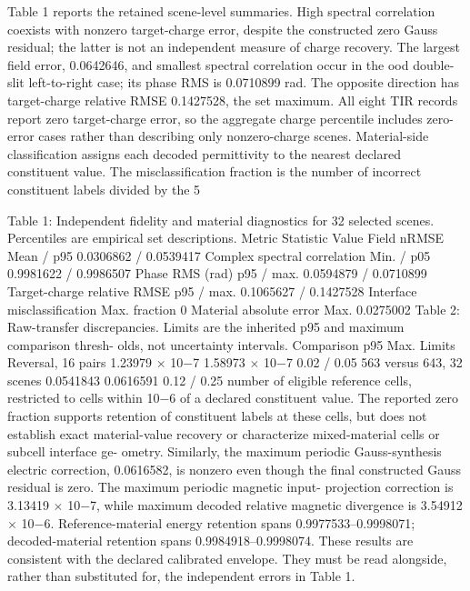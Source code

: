 \documentclass[11pt]{article}
\begin{document}
Table 1 reports the retained scene-level summaries. High spectral correlation coexists with nonzero
target-charge error, despite the constructed zero Gauss residual; the latter is not an independent
measure of charge recovery. The largest field error, 0.0642646, and smallest spectral correlation
occur in the ood double-slit left-to-right case; its phase RMS is 0.0710899 rad. The opposite
direction has target-charge relative RMSE 0.1427528, the set maximum. All eight TIR records
report zero target-charge error, so the aggregate charge percentile includes zero-error cases rather
than describing only nonzero-charge scenes.
Material-side classification assigns each decoded permittivity to the nearest declared constituent
value. The misclassification fraction is the number of incorrect constituent labels divided by the
5

Table 1: Independent fidelity and material diagnostics for 32 selected scenes. Percentiles are
empirical set descriptions.
Metric Statistic Value
Field nRMSE Mean / p95 0.0306862 / 0.0539417
Complex spectral correlation Min. / p05 0.9981622 / 0.9986507
Phase RMS (rad) p95 / max. 0.0594879 / 0.0710899
Target-charge relative RMSE p95 / max. 0.1065627 / 0.1427528
Interface misclassification Max. fraction 0
Material absolute error Max. 0.0275002
Table 2: Raw-transfer discrepancies. Limits are the inherited p95 and maximum comparison thresh-
olds, not uncertainty intervals.
Comparison p95 Max. Limits
Reversal, 16 pairs 1.23979 \ensuremath{\times} 10\ensuremath{-}7 1.58973 \ensuremath{\times} 10\ensuremath{-}7 0.02 / 0.05
563 versus 643, 32 scenes 0.0541843 0.0616591 0.12 / 0.25
number of eligible reference cells, restricted to cells within 10\ensuremath{-}6 of a declared constituent value.
The reported zero fraction supports retention of constituent labels at these cells, but does not
establish exact material-value recovery or characterize mixed-material cells or subcell interface ge-
ometry. Similarly, the maximum periodic Gauss-synthesis electric correction, 0.0616582, is nonzero
even though the final constructed Gauss residual is zero. The maximum periodic magnetic input-
projection correction is 3.13419 \ensuremath{\times} 10\ensuremath{-}7, while maximum decoded relative magnetic divergence is
3.54912 \ensuremath{\times} 10\ensuremath{-}6.
Reference-material energy retention spans 0.9977533–0.9998071; decoded-material retention spans
0.9984918–0.9998074. These results are consistent with the declared calibrated envelope. They
must be read alongside, rather than substituted for, the independent errors in Table 1.
\end{document}
